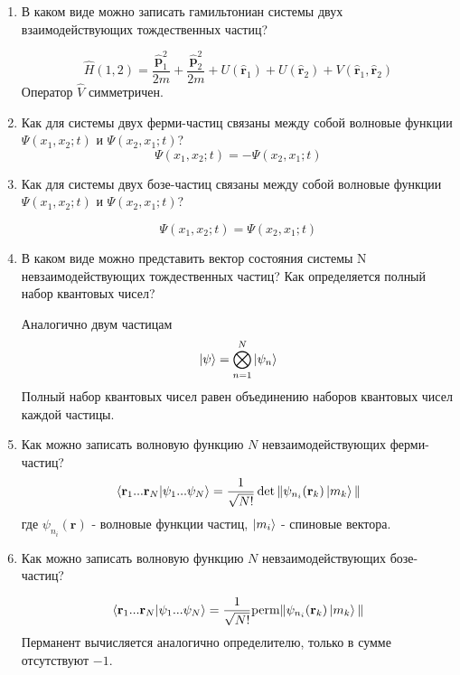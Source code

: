 \documentclass{article}
\begin{document}
\begin{enumerate}
	\item {В каком виде можно записать гамильтониан системы двух взаимодействующих тождественных частиц?}
	
	\begin{equation}
		\hat{H}(1,2) = \frac{\hat{\textbf{p}}_1^2}{2m} + \frac{\hat{\textbf{p}}_2^2}{2m} + U(\hat{\textbf{r}}_1) + U(\hat{\textbf{r}}_2) + V(\hat{\textbf{r}}_1, \hat{\textbf{r}}_2)
	\end{equation}
	Оператор $\hat{V}$ симметричен.
	
	\item {Как для системы двух ферми-частиц связаны между собой волновые функции $\Psi(x_1, x_2;t)$ и $\Psi(x_2, x_1;t)$?}
	\begin{equation}
		\Psi(x_1, x_2;t) = -\Psi(x_2, x_1;t)
	\end{equation}
	
	\item {Как для системы двух бозе-частиц связаны между собой волновые функции $\Psi(x_1, x_2;t)$ и $\Psi(x_2, x_1;t)$?}
	
	\begin{equation}
		\Psi(x_1, x_2;t) = \Psi(x_2, x_1;t)
	\end{equation}
	
	\item {В каком виде можно представить вектор состояния системы N невзаимодействующих тождественных частиц? Как определяется полный набор квантовых чисел?}
	
	Аналогично двум частицам	
	\begin{equation}
		\ket{\psi} = \bigotimes\limits_{n=1}^N \ket{\psi_n}
	\end{equation}
	Полный набор квантовых чисел равен объединению наборов квантовых чисел каждой частицы.
	
	\item {Как можно записать волновую функцию $N$ невзаимодействующих ферми-частиц?}
	\begin{equation}
		\braket{\textbf{r}_1...\textbf{r}_N|\psi_1 ... \psi_N} = \frac{1}{\sqrt{N!}}\det \|\psi_{n_i}(\textbf{r}_k) \ket{m_k} \|
	\end{equation}
	где $\psi_{n_i}(\textbf{r})$ - волновые функции частиц, $\ket{m_i}$ - спиновые вектора.
	
	\item {Как можно записать волновую функцию $N$ невзаимодействующих бозе-частиц?}
	
	\begin{equation}
		\braket{\textbf{r}_1...\textbf{r}_N|\psi_1 ... \psi_N} = \frac{1}{\sqrt{N!}}\text{perm} \|\psi_{n_i}(\textbf{r}_k) \ket{m_k} \|
	\end{equation}
	Перманент вычисляется аналогично определителю, только в сумме отсутствуют $-1$.
	

\end{enumerate}
\end{document}
